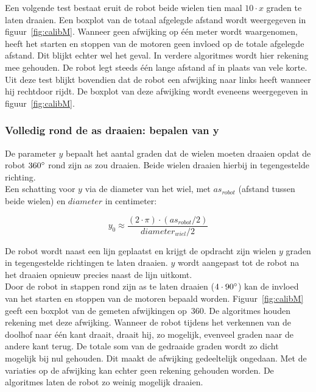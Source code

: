 \documentclass[t1]{penoverslag}
\begin{document}
Een volgende test bestaat eruit de robot beide wielen tien maal $10 \cdot x$ graden te laten draaien. Een boxplot van de totaal afgelegde afstand wordt weergegeven in figuur~\ref{fig:calibM}. Wanneer geen afwijking op \'e\'en meter wordt waargenomen, heeft het starten en stoppen van de motoren geen invloed op de totale afgelegde afstand. Dit blijkt echter wel het geval. In verdere algoritmes wordt hier rekening mee gehouden. De robot legt steeds \'e\'en lange afstand af in plaats van vele korte.\\
Uit deze test blijkt bovendien dat de robot een afwijking naar links heeft wanneer hij rechtdoor rijdt. De boxplot van deze afwijking wordt eveneens weergegeven in figuur~\ref{fig:calibM}.


\subsubsection{Volledig rond de as draaien: bepalen van y} %
\label{ssec:calibMy}
De parameter $y$ bepaalt het aantal graden dat de wielen moeten draaien opdat de robot $360\degree$ rond zijn as zou draaien. Beide wielen draaien hierbij in tegengestelde richting.\\
Een schatting voor $y$ via de diameter van het wiel, met $as_{robot}$ (afstand tussen beide wielen) en $diameter$ in centimeter:

\begin{equation*}
y_{0} \approx \frac{(2 \cdot \pi) \cdot (as_{robot}/2)}{diameter_{wiel}/2}
\end{equation*}

De robot wordt naast een lijn geplaatst en krijgt de opdracht zijn wielen $y$ graden in tegengestelde richtingen te laten draaien. $y$ wordt aangepast tot de robot na het draaien opnieuw precies naast de lijn uitkomt.\\


Door de robot in stappen rond zijn as te laten draaien ($4 \cdot 90\degree$) kan de invloed van het starten en stoppen van de motoren bepaald worden. Figuur~\ref{fig:calibM} geeft een boxplot van de gemeten afwijkingen op~360\degree. De algoritmes houden rekening met deze afwijking. Wanneer de robot tijdens het verkennen van de doolhof naar \'e\'en kant draait, draait hij, zo mogelijk, evenveel graden naar de andere kant terug. De totale som van de gedraaide graden wordt zo dicht mogelijk bij nul gehouden. Dit maakt de afwijking gedeeltelijk ongedaan. Met de variaties op de afwijking kan echter geen rekening gehouden worden. De algoritmes laten de robot zo weinig mogelijk draaien.
\end{document}
